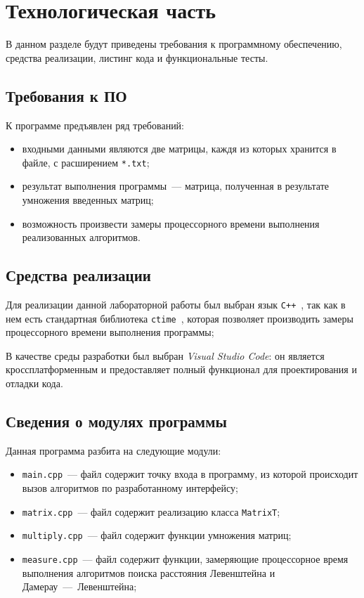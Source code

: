 \chapter{Технологическая часть}
В данном разделе будут приведены требования к программному обеспечению, средства реализации, листинг кода и функциональные тесты.

\section{Требования к ПО}
К программе предъявлен ряд требований:
\begin{itemize}
    \item входными данными являются две матрицы, каждя из которых хранится в файле, с расширением \texttt{*.txt};
    \item результат выполнения программы~--- матрица, полученная в результате умножения введенных матриц;
    \item возможность произвести замеры процессорного времени выполнения реализованных алгоритмов.
\end{itemize}

\section{Средства реализации}
Для реализации данной лабораторной работы был выбран язык \texttt{C++}~\cite{cpp-lang}, так как в нем есть стандартная библиотека \texttt{ctime}~\cite{cpp-lang-time}, которая позволяет производить замеры процессорного времени выполнения программы;

В качестве среды разработки был выбран \textit{Visual Studio Code}: он является кроссплатформенным и предоставляет полный функционал для проектирования и отладки кода.
 
\section{Сведения о модулях программы}
Данная программа разбита на следующие модули:

\begin{itemize}
	\item \texttt{main.cpp}~--- файл содержит точку входа в программу, из которой происходит вызов алгоритмов по разработанному интерфейсу;
	\item \texttt{matrix.cpp}~--- файл содержит реализацию класса \texttt{MatrixT};
	\item \texttt{multiply.cpp}~--- файл содержит функции умножения матриц;
	\item \texttt{measure.cpp}~--- файл содержит функции, замеряющие процессорное время выполнения алгоритмов поиска расстояния Левенштейна и Дамерау~---~Левенштейна;
\end{itemize}

